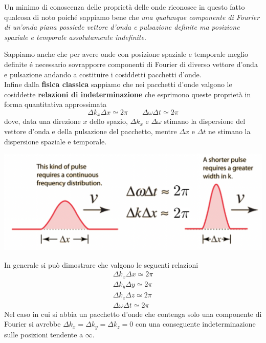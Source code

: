 Un minimo di conoscenza delle proprietà delle onde riconosce in questo
fatto qualcosa di noto poiché sappiamo bene che \emph{una qualunque
componente di Fourier di un'onda piana possiede vettore d'onda e
pulsazione definite ma posizione spaziale e temporale assolutamente
indefinite}.

Sappiamo anche che per avere onde con posizione spaziale e temporale
meglio definite é necessario sovrapporre componenti di Fourier di
diverso vettore d'onda e pulsazione andando a costituire i cosiddetti
pacchetti d'onde.\\
Infine dalla \textbf{fisica classica} sappiamo che nei pacchetti d'onde valgono
le cosiddette \textbf{relazioni di indeterminazione} che esprimono
queste proprietà in forma quantitativa approssimata
\[
    \Delta k_{x} \Delta x \simeq2 \pi \qquad \Delta \omega \Delta t \simeq2 \pi
\] dove, data una direzione $x$ dello spazio, \(\Delta k_{x}\) e
\(\Delta \omega\) stimano la dispersione del vettore d'onda e della
pulsazione del pacchetto, mentre \(\Delta x\) e \(\Delta t\) ne stimano
la dispersione spaziale e temporale.
\begin{marginfigure}
    \includegraphics{figs/rel-indet}
    \label{fig:rel-indet}
\end{marginfigure}

In generale si può dimostrare che valgono le seguenti relazioni
\begin{gather*}
    \Delta k_{x} \Delta x \simeq2 \pi\\
    \Delta k_{y} \Delta y \simeq2 \pi\\
    \Delta k_{z} \Delta z \simeq2 \pi\\
    \Delta \omega \Delta t \simeq2 \pi
\end{gather*} Nel caso in cui si abbia un pacchetto d'onde che contenga solo una
componente di Fourier si avrebbe
\(\Delta k_{x} = \Delta k_{y} = \Delta k_{z} = 0\) con una conseguente
indeterminazione sulle posizioni tendente a \(\infty\).

